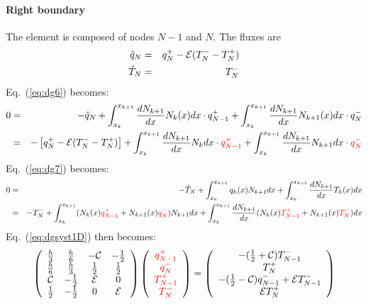\paragraph{Right boundary} The element is composed of nodes $N-1$ and $N$. The fluxes are 
\begin{eqnarray}
\hat{q}_N &=& q_N^+ -{\cal E} (T_N^--T_N^+) \nonumber  \\
\hat{T}_N &=& T_N^- \nonumber
\end{eqnarray}
Eq.~(\ref{eq:dg6}) becomes:
\begin{eqnarray}
0 
&=& -\hat{q}_{N} 
+ \int_{x_k}^{x_{k+1}} \frac{dN_{k+1}}{dx} N_k(x) dx \cdot q_{N-1}^+ 
+ \int_{x_k}^{x_{k+1}} \frac{dN_{k+1}}{dx} N_{k+1}(x) dx \cdot q_{N}^- \nonumber\\ 
&=& - \left[ q_N^+ -{\cal E} (T_N^--T_N^+) \right] 
+ \int_{x_k}^{x_{k+1}} \frac{dN_{k+1}}{dx} N_k dx \cdot {\color{red}q_{N-1}^+} 
+ \int_{x_k}^{x_{k+1}} \frac{dN_{k+1}}{dx} N_{k+1}dx \cdot {\color{red}q_{N}^-} 
\end{eqnarray}
Eq.~(\ref{eq:dg7}) becomes:
\begin{eqnarray}
0
&=& -\hat{T}_{N} 
+ \int_{x_k}^{x_{k+1}}  q_h(x) N_{k+1} dx
+ \int_{x_k}^{x_{k+1}} \frac{dN_{k+1} }{dx} T_h(x) dx  \nonumber\\
&=&-T_N^- + \int_{x_k}^{x_{k+1}} (N_k(x) {\color{red}q_{N-1}^+} + N_{k+1}(x) {\color{red}q_{N}^-})  N_{k+1} dx
+ \int_{x_k}^{x_{k+1}} \frac{dN_{k+1} }{dx} (N_k(x) {\color{red} T_{N-1}^+} + N_{k+1}(x) {\color{red}T_{N}^-}) dx
\nonumber 
\end{eqnarray}
Eq.~(\ref{eq:dgsyst1D}) then becomes:
\begin{eqnarray}
\left(
\begin{array}{cccc}
\frac{h}{3}    &  \frac{h}{6} & -{\cal C}   &-\frac{1}{2} \\
\frac{h}{6}    &  \frac{h}{3} & \frac{1}{2} & \frac{1}{2} \\
{\cal C}    & -\frac{1}{2} & {\cal E} & 0\\
\frac{1}{2} & -\frac{1}{2} & 0 & {\cal E}
\end{array}
\right) \left(
\begin{array}{c}
     \color{red}{q_{N-1}^+}  \\
     \color{red}{q_{N}^-} \\
     \color{red}{T_{N-1}^+} \\
     \color{red}{T_{N}^-}
\end{array}
\right)=\left(
\begin{array}{cc}
     -(\frac{1}{2}+{\cal{C}}) T_{N-1}^-  \\
      T_{N}^+ \\
     -(\frac{1}{2}-{\cal{C}})q_{N-1}^-+{\cal{E}} T_{N-1}^-  \\
      {\cal{E}} T_{N}^+
\end{array}
\right)
\label{eq:dgsyst1Dright}
\end{eqnarray}


